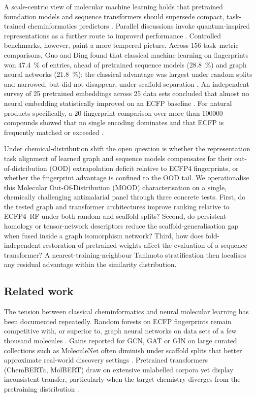 \documentclass[11pt,a4paper]{article}
\begin{document}
A scale-centric view of molecular machine learning holds that pretrained foundation models and sequence transformers should supersede compact, task-trained cheminformatics predictors \citep{mol_tdl_2026,tn_efficient_2026}. Parallel discussions invoke quantum-inspired representations as a further route to improved performance \citep{naleczcharkiewicz2024,kumar2024quantumdrug}. Controlled benchmarks, however, paint a more tempered picture. Across \num{156} task--metric comparisons, Guo and Ding found that classical machine learning on fingerprints won \qty{47.4}{\percent} of entries, ahead of pretrained sequence models (\qty{28.8}{\percent}) and graph neural networks (\qty{21.8}{\percent}); the classical advantage was largest under random splits and narrowed, but did not disappear, under scaffold separation \citep{guo_ding_2026}. An independent survey of \num{25} pretrained embeddings across \num{25} data sets concluded that almost no neural embedding statistically improved on an ECFP baseline \citep{benchmark_pretrained_2025}. For natural products specifically, a \num{20}-fingerprint comparison over more than \num{100000} compounds showed that no single encoding dominates and that ECFP is frequently matched or exceeded \citep{boldini2024}.

Under chemical-distribution shift the open question is whether the representation task alignment of learned graph and sequence models compensates for their out-of-distribution (OOD) extrapolation deficit relative to ECFP4 fingerprints, or whether the fingerprint advantage is confined to the OOD tail. We operationalise this Molecular Out-Of-Distribution (MOOD) characterisation on a single, chemically challenging antimalarial panel through three concrete tests. First, do the tested graph and transformer architectures improve ranking relative to ECFP4--RF under both random and scaffold splits? Second, do persistent-homology or tensor-network descriptors reduce the scaffold-generalisation gap when fused inside a graph isomorphism network? Third, how does fold-independent restoration of pretrained weights affect the evaluation of a sequence transformer? A nearest-training-neighbour Tanimoto stratification then localises any residual advantage within the similarity distribution.

\subsection{Related work}

The tension between classical cheminformatics and neural molecular learning has been documented repeatedly. Random forests on ECFP fingerprints remain competitive with, or superior to, graph neural networks on data sets of a few thousand molecules \citep{guo_ding_2026,benchmark_pretrained_2025}. Gains reported for GCN, GAT or GIN on large curated collections such as MoleculeNet often diminish under scaffold splits that better approximate real-world discovery settings \citep{wu_molnet_2018,guo_ding_2026}. Pretrained transformers (ChemBERTa, MolBERT) draw on extensive unlabelled corpora yet display inconsistent transfer, particularly when the target chemistry diverges from the pretraining distribution \citep{chemberta_2020,benchmark_pretrained_2025}.
\end{document}
